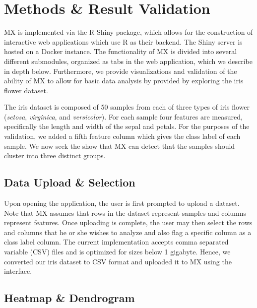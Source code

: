 \documentclass[12pt]{article}
\begin{document}
\section{Methods \& Result Validation}
\label{sec:meth}

MX is implemented via the R Shiny package, which allows for the construction of interactive web applications which use R as their backend. The Shiny server is hosted on a Docker instance. The functionality of MX is divided into several different submodules, organized as tabs in the web application, which we  describe in depth below. Furthermore, we provide visualizations and validation of the ability of MX to allow for basic data analysis by provided by exploring the iris flower dataset. 

The iris dataset is composed of 50 samples from each of three types of iris flower (\textit{setosa}, \textit{virginica}, and \textit{versicolor}). For each sample four features are measured, specifically the length and width of the sepal and petals. For the purposes of the validation, we added a fifth feature column which gives the class label of each sample. We now seek the show that MX can detect that the samples should cluster into three distinct groups.

\subsection{Data Upload \& Selection}
\label{subsec:SubSecUpload}

Upon opening the application, the user is first prompted to upload a dataset. Note that MX assumes that rows in the dataset represent samples and columns represent features. Once uploading is complete, the user may then select the rows and columns that he or she wishes to analyze and also flag a specific column as a class label column. The current implementation accepts comma separated variable (CSV) files and is optimized for sizes below 1 gigabyte. Hence, we converted our iris dataset to CSV format and uploaded it to MX using the interface.

\subsection{Heatmap \& Dendrogram}
\label{subsec:SubSecHeatmap}
\end{document}
